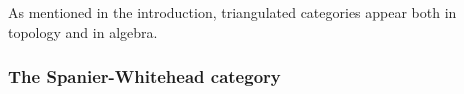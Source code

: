 As mentioned in the introduction, triangulated categories appear both in topology and in algebra.

\subsubsection{The Spanier-Whitehead category}
